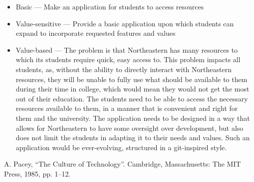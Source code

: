 \documentclass[conference]{IEEEtran}
\begin{document}
\begin{itemize}

  \item Basic — Make an application for students to access resources

  \item Value-sensitive — Provide a basic application upon which students can expand to incorporate requested features and values

  \item Value-based — The problem is that Northeastern has many resources to which its students require quick, easy access to. This problem impacts all students, as, without the ability to directly interact with Northeastern resources, they will be unable to fully use what should be available to them during their time in college, which would mean they would not get the most out of their education. The students need to be able to access the necessary resources available to them, in a manner that is convenient and right for them and the university. The application needs to be designed in a way that allows for Northeastern to have some oversight over development, but also does not limit the students in adapting it to their needs and values. Such an application would be ever-evolving, structured in a git-inspired style.

\end{itemize}

\begin{thebibliography}{00}
 A. Pacey, ``The Culture of Technology''. Cambridge, Massachusetts: The MIT Press, 1985, pp. 1–12. 
\end{thebibliography}
\end{document}
